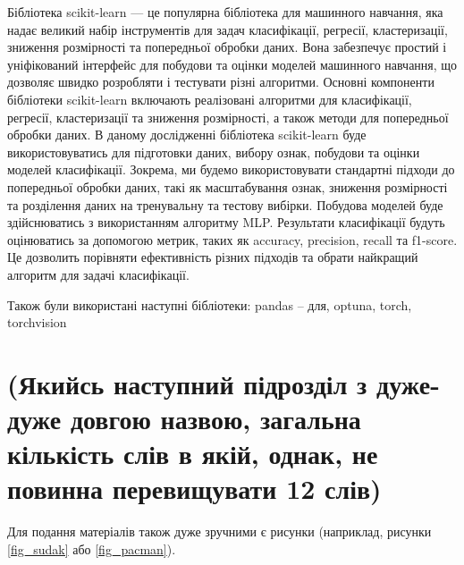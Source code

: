 Бібліотека scikit-learn --- це популярна бібліотека для машинного навчання, яка надає великий набір інструментів для задач класифікації, регресії, кластеризації, зниження розмірності та попередньої обробки даних. Вона забезпечує простий і уніфікований інтерфейс для побудови та оцінки моделей машинного навчання, що дозволяє швидко розробляти і тестувати різні алгоритми. Основні компоненти бібліотеки scikit-learn включають реалізовані алгоритми для класифікації, регресії, кластеризації та зниження розмірності, а також методи для попередньої обробки даних. В даному дослідженні бібліотека scikit-learn буде використовуватись для підготовки даних, вибору ознак, побудови та оцінки моделей класифікації. Зокрема, ми будемо використовувати стандартні підходи до попередньої обробки даних, такі як масштабування ознак, зниження розмірності та розділення даних на тренувальну та тестову вибірки. Побудова моделей буде здійснюватись з використанням алгоритму MLP. Результати класифікації будуть оцінюватись за допомогою метрик, таких як accuracy, precision, recall та f1-score. Це дозволить порівняти ефективність різних підходів та обрати найкращий алгоритм для задачі класифікації.

Також були використані наступні бібліотеки: pandas -- для, optuna, torch, torchvision

\section{(Якийсь наступний підрозділ з дуже-дуже довгою назвою, загальна кількість слів в якій, однак, не повинна перевищувати 12 слів)}

Для подання матеріалів також дуже зручними є рисунки (наприклад, рисунки 
\ref{fig_sudak} або \ref{fig_pacman}).


